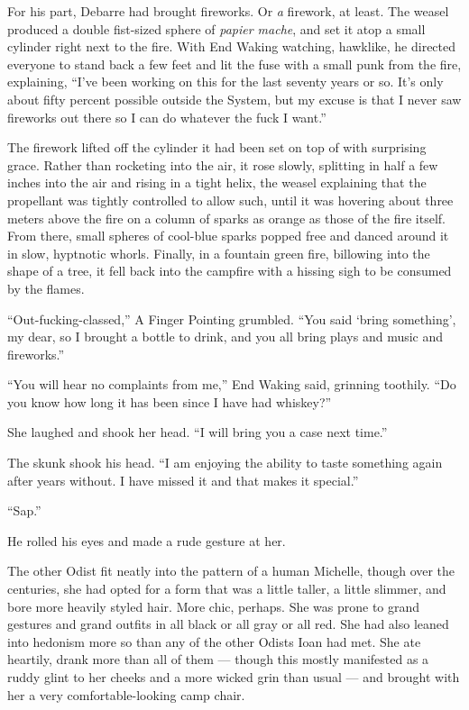 For his part, Debarre had brought fireworks. Or \emph{a} firework, at least. The weasel produced a double fist-sized sphere of \emph{papier mache}, and set it atop a small cylinder right next to the fire. With End Waking watching, hawklike, he directed everyone to stand back a few feet and lit the fuse with a small punk from the fire, explaining, ``I've been working on this for the last seventy years or so. It's only about fifty percent possible outside the System, but my excuse is that I never saw fireworks out there so I can do whatever the fuck I want.''

The firework lifted off the cylinder it had been set on top of with surprising grace. Rather than rocketing into the air, it rose slowly, splitting in half a few inches into the air and rising in a tight helix, the weasel explaining that the propellant was tightly controlled to allow such, until it was hovering about three meters above the fire on a column of sparks as orange as those of the fire itself. From there, small spheres of cool-blue sparks popped free and danced around it in slow, hyptnotic whorls. Finally, in a fountain green fire, billowing into the shape of a tree, it fell back into the campfire with a hissing sigh to be consumed by the flames.

``Out-fucking-classed,'' A Finger Pointing grumbled. ``You said `bring something', my dear, so I brought a bottle to drink, and you all bring plays and music and fireworks.''

``You will hear no complaints from me,'' End Waking said, grinning toothily. ``Do you know how long it has been since I have had whiskey?''

She laughed and shook her head. ``I will bring you a case next time.''

The skunk shook his head. ``I am enjoying the ability to taste something again after years without. I have missed it and that makes it special.''

``Sap.''

He rolled his eyes and made a rude gesture at her.

The other Odist fit neatly into the pattern of a human Michelle, though over the centuries, she had opted for a form that was a little taller, a little slimmer, and bore more heavily styled hair. More chic, perhaps. She was prone to grand gestures and grand outfits in all black or all gray or all red. She had also leaned into hedonism more so than any of the other Odists Ioan had met. She ate heartily, drank more than all of them — though this mostly manifested as a ruddy glint to her cheeks and a more wicked grin than usual — and brought with her a very comfortable-looking camp chair.

